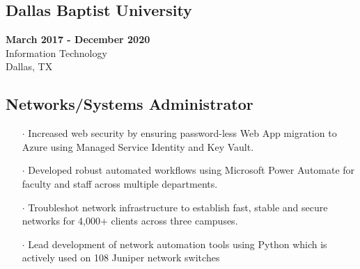 \documentclass[10pt]{article}
\begin{document}
\begin{paracol}{2}
    \begin{leftcolumn} 
        \sloppy
        \subsection*{Dallas Baptist University}
        \textbf{March 2017 -  December 2020} \\
        Information Technology \\
        Dallas, TX
    \end{leftcolumn}

    \begin{rightcolumn} 
        \subsection*{Networks/Systems Administrator}
        \begin{itemize}[leftmargin=.28cm, itemsep=1pt]
            \item[$\cdot$] Increased web security by ensuring password-less Web App migration to Azure using Managed Service Identity and Key Vault.
            \item[$\cdot$] Developed robust automated workflows using Microsoft Power Automate for faculty and staff across multiple departments.
            \item[$\cdot$] Troubleshot network infrastructure to establish fast, stable and secure networks for 4,000+ clients across three campuses. 
            \item[$\cdot$] Lead development of network automation tools using Python which is actively used on 108 Juniper network switches
        \end{itemize}
    \end{rightcolumn}
\end{paracol}
\vspace{-.6cm}
\end{document}
